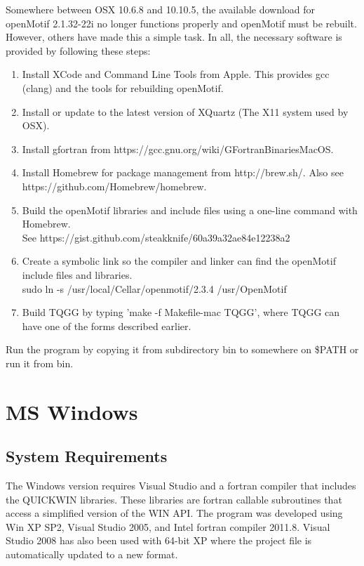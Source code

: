 \documentclass[10pt]{article}
\begin{document}
Somewhere between OSX 10.6.8 and 10.10.5, the available download for openMotif 2.1.32-22i no longer 
functions properly and openMotif must be rebuilt. However, others have made this a simple task.
In all, the necessary software is provided by following these steps:
\begin{enumerate}
 \item Install XCode and Command Line Tools from Apple. This provides gcc (clang) and the tools
 for rebuilding openMotif.
 \item Install or update to the latest version of XQuartz (The X11 system used by OSX). 
 \item Install gfortran from https://gcc.gnu.org/wiki/GFortranBinariesMacOS.
 \item Install Homebrew for package management from http://brew.sh/. Also see https://github.com/Homebrew/homebrew.
 \item Build the openMotif libraries and include files using a one-line command with Homebrew.\\ 
 See https://gist.github.com/steakknife/60a39a32ae84e12238a2
 \item Create a symbolic link so the compiler and linker can find the openMotif include files and libraries.\\
 sudo ln -s /usr/local/Cellar/openmotif/2.3.4 /usr/OpenMotif
 \item Build TQGG by typing 'make -f Makefile-mac TQGG', where TQGG can have one of the forms described earlier.
\end{enumerate}

Run the program by copying it from subdirectory bin to somewhere on \$PATH or run it from bin. 

\section{MS Windows}
\subsection{System Requirements}
The Windows version requires Visual Studio and a fortran compiler that includes the QUICKWIN
libraries. These libraries are fortran callable subroutines that access a simplified version
of the WIN API. The program was developed using Win XP SP2, Visual Studio 2005, and Intel fortran
compiler 2011.8. Visual Studio 2008 has also been used with 64-bit XP where the project file is
automatically updated to a new format.
\end{document}
